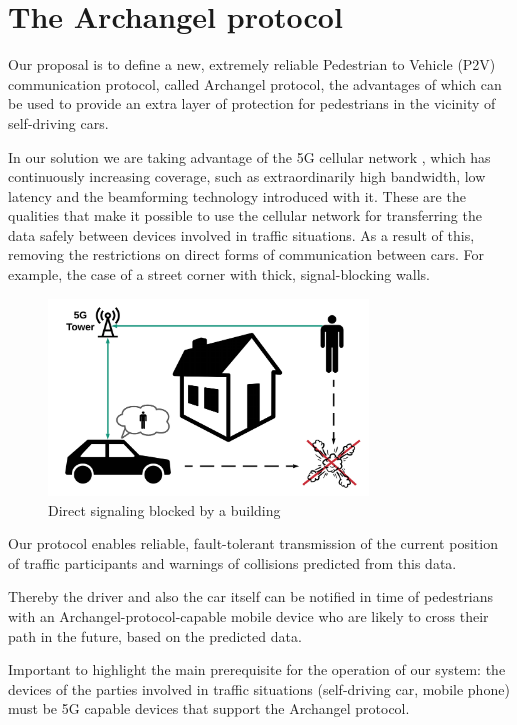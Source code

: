 \documentclass[conference]{IEEEtran}
\begin{document}
\section{The Archangel protocol}
Our proposal is to define a new, extremely reliable Pedestrian to Vehicle (P2V) communication protocol, called Archangel protocol, the advantages of which can be used to provide an extra layer of protection for pedestrians in the vicinity of self-driving cars.

In our solution we are taking advantage of the 5G cellular network \cite{b4,b5}, which has continuously increasing coverage, such as extraordinarily high bandwidth, low latency and the beamforming technology introduced with it. These are the qualities that make it possible to use the cellular network for transferring the data safely between devices involved in traffic situations. As a result of this, removing the restrictions on direct forms of communication between cars. For example, the case of a street corner with thick, signal-blocking walls.

\begin{figure}[ht]
    \centering
    \includegraphics[width=8.5cm]{./pics/Corner.png}
    \caption{Direct signaling blocked by a building}
\end{figure}

Our protocol enables reliable, fault-tolerant transmission of the current position of traffic participants and warnings of collisions predicted from this data.

Thereby the driver and also the car itself can be notified in time of pedestrians with an Archangel-protocol-capable mobile device who are likely to cross their path in the future, based on the predicted data.

Important to highlight the main prerequisite for the operation of our system: the devices of the parties involved in traffic situations (self-driving car, mobile phone) must be 5G capable devices that support the Archangel protocol.
\end{document}
